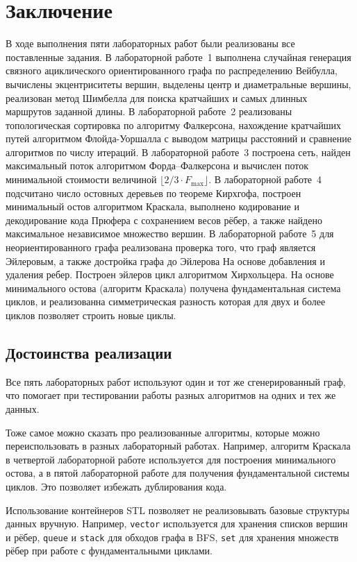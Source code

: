 \section*{Заключение}

В ходе выполнения пяти лабораторных работ были реализованы все
поставленные задания. В лабораторной работе~1 выполнена случайная генерация
связного ациклического ориентированного графа по распределению Вейбулла,
вычислены экцентриситеты вершин, выделены центр и диаметральные вершины,
реализован метод Шимбелла для поиска кратчайших и самых длинных маршрутов
заданной длины.
В лабораторной работе~2 реализованы топологическая сортировка по алгоритму
Фалкерсона, нахождение кратчайших путей алгоритмом Флойда-Уоршалла
с выводом матрицы расстояний и сравнение алгоритмов по числу итераций.
В лабораторной работе~3 построена сеть, найден максимальный поток
алгоритмом Форда--Фалкерсона и вычислен поток минимальной стоимости
величиной $\lfloor 2/3 \cdot F_{\max} \rfloor$.
В лабораторной работе~4 подсчитано число остовных деревьев по теореме Кирхгофа,
построен минимальный остов алгоритмом Краскала, выполнено кодирование
и декодирование кода Прюфера с сохранением весов рёбер, а также найдено
максимальное независимое множество вершин.
В лабораторной работе~5 для неориентированного графа реализована проверка того, что граф является Эйлеровым, а также достройка графа до Эйлерова На основе добавления и удаления ребер. Построен эйлеров цикл алгоритмом Хирхольцера. На основе минимального остова (алгоритм Краскала)
получена фундаментальная система циклов, и реализованна симметрическая разность которая для двух и более циклов позволяет строить новые циклы.

\subsection*{Достоинства реализации}

Все пять лабораторных работ используют один и тот же сгенерированный граф, что помогает при тестировании работы разных алгоритмов на одних
и тех же данных.

Тоже самое можно сказать про реализованные алгоритмы, которые можно переиспользовать в разных лабораторный работах. Например, алгоритм Краскала в четвертой лабораторной работе используется для построения минимального остова, а в пятой лабораторной работе для получения фундаментальной системы циклов. Это позволяет избежать дублирования кода.

Использование контейнеров STL позволяет не реализовывать базовые структуры данных вручную. Например, \texttt{vector} используется для хранения списков вершин и рёбер, \texttt{queue} и \texttt{stack} для обходов графа в BFS, \texttt{set} для хранения множеств рёбер при работе с фундаментальными циклами.
